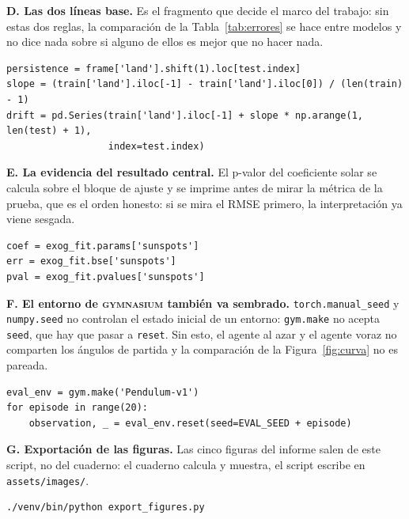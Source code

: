 \documentclass[10pt,journal]{IEEEtran}
\begin{document}
  \textbf{D. Las dos l\'ineas base.}
  Es el fragmento que decide el marco del trabajo: sin estas dos reglas, la comparaci\'on de la Tabla~\ref{tab:errores} se hace entre modelos y no dice nada sobre si alguno de ellos es mejor que no hacer nada.

\begin{lstlisting}
persistence = frame['land'].shift(1).loc[test.index]
slope = (train['land'].iloc[-1] - train['land'].iloc[0]) / (len(train) - 1)
drift = pd.Series(train['land'].iloc[-1] + slope * np.arange(1, len(test) + 1),
                  index=test.index)
  \end{lstlisting}

  \textbf{E. La evidencia del resultado central.}
  El p-valor del coeficiente solar se calcula sobre el bloque de ajuste y se imprime antes de mirar la m\'etrica de la prueba, que es el orden honesto: si se mira el RMSE primero, la interpretaci\'on ya viene sesgada.

\begin{lstlisting}
coef = exog_fit.params['sunspots']
err = exog_fit.bse['sunspots']
pval = exog_fit.pvalues['sunspots']
  \end{lstlisting}

  \textbf{F. El entorno de \textsc{gymnasium} tambi\'en va sembrado.}
  \texttt{torch.manual\_seed} y \texttt{numpy.seed} no controlan el estado inicial de un entorno: \texttt{gym.make} no acepta \texttt{seed}, que hay que pasar a \texttt{reset}. Sin esto, el agente al azar y el agente voraz no comparten los \'angulos de partida y la comparaci\'on de la Figura~\ref{fig:curva} no es pareada.

\begin{lstlisting}
eval_env = gym.make('Pendulum-v1')
for episode in range(20):
    observation, _ = eval_env.reset(seed=EVAL_SEED + episode)
  \end{lstlisting}

  \textbf{G. Exportaci\'on de las figuras.}
  Las cinco figuras del informe salen de este script, no del cuaderno: el cuaderno calcula y muestra, el script escribe en \texttt{assets/images/}.

\begin{lstlisting}
./venv/bin/python export_figures.py
  \end{lstlisting}

  
  
\end{document}
